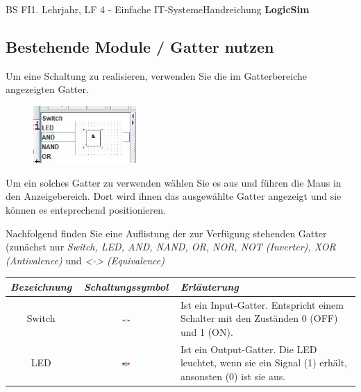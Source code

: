 \documentclass[11pt,oneside,openany,headings=optiontotoc,11pt,numbers=noenddot]{article}
\begin{document}
\begin{worksheet}{BS FI}{1. Lehrjahr, LF 4 - Einfache IT-Systeme}{Handreichung \textbf{LogicSim}}
		\subsection{Bestehende Module / Gatter nutzen}
		Um eine Schaltung zu realisieren, verwenden Sie die im Gatterbereiche angezeigten Gatter.
		\begin{figure}
			\vspace{-10pt}
			\hspace{-15pt}
			\includegraphics[width=0.35\textwidth]{../99_Bilder/gatter_LS.jpg}\\
		\end{figure}
		Um ein solches Gatter zu verwenden wählen Sie es aus 
		und führen die Maus in den Anzeigebereich. Dort wird ihnen das ausgewählte Gatter angezeigt und sie können es entsprechend positionieren.\\
		\par\noindent
		Nachfolgend finden Sie eine Auflistung der zur Verfügung stehenden Gatter (zunächst nur \textit{Switch, LED, AND, NAND, OR, NOR, NOT (Inverter), XOR (Antivalence)} und \textit{<-> (Equivalence)}\\
		\par\noindent
		\begin{tabularx}{\textwidth}{c|c|X}
			\textit{Bezeichnung} & \textit{Schaltungssymbol} & \textit{Erläuterung}\\
			\hline
			\hline
			Switch & \includegraphics[width=0.1\textwidth, align=t]{../99_Bilder/switch.jpg} & Ist ein Input-Gatter. Entspricht einem Schalter mit den Zuständen 0 (OFF) und 1 (ON).\\
			\hline
			LED & \includegraphics[width=0.1\textwidth,align=t]{../99_Bilder/LED.jpg} & Ist ein Output-Gatter. Die LED leuchtet, wenn sie ein Signal (1) erhält, ansonsten (0) ist sie aus.\\
			\hline
		\end{tabularx}
		\begin{tabularx}{\textwidth}{c|c|X|c}

\end{tabularx}
\end{worksheet}
\end{document}
